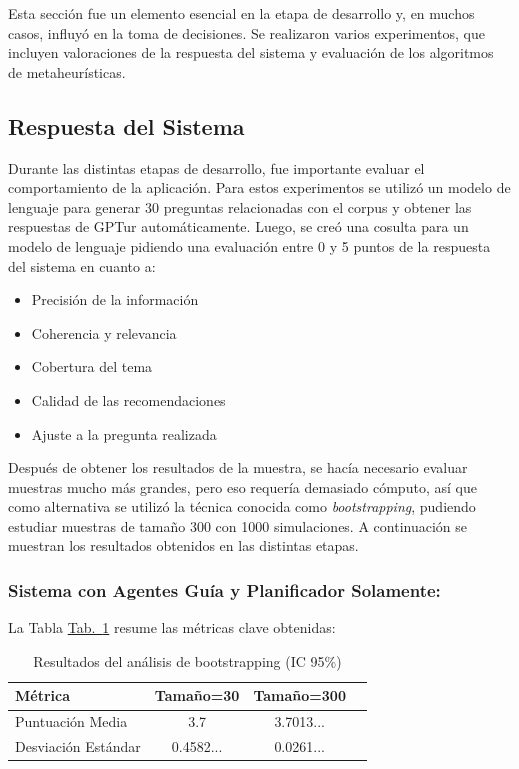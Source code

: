 \documentclass[10pt]{llncs}
\newcommand{\tabref}[1]{\hyperref[#1]{Tab.~\ref*{#1}}}
\begin{document}
Esta sección fue un elemento esencial en la etapa de desarrollo y, en muchos casos, influyó en la toma de decisiones. Se realizaron varios experimentos, que incluyen valoraciones de la respuesta del sistema y evaluación de los algoritmos de metaheurísticas.
\vspace{\baselineskip}
\subsection{Respuesta del Sistema}

Durante las distintas etapas de desarrollo, fue importante evaluar el comportamiento de la aplicación. Para estos experimentos se utilizó un modelo de lenguaje para generar 30 preguntas relacionadas con el corpus y obtener las respuestas de GPTur automáticamente. Luego, 
se creó una cosulta para un modelo de lenguaje pidiendo una evaluación entre 0 y 5 puntos de la respuesta del sistema en cuanto a:
\begin{itemize}
    \item  Precisión de la información
    \item Coherencia y relevancia
    \item Cobertura del tema
    \item Calidad de las recomendaciones
    \item Ajuste a la pregunta realizada
\end{itemize}

Después de obtener los resultados de la muestra, se hacía necesario evaluar muestras mucho más grandes, pero eso requería demasiado cómputo, así que como alternativa se utilizó la técnica conocida como \textit{bootstrapping}, pudiendo estudiar muestras de tamaño 300 con 1000 simulaciones. A continuación se muestran los resultados obtenidos 
en las distintas etapas.

\subsubsection{Sistema con Agentes Guía y Planificador Solamente:}

La Tabla \tabref{tab:boot_results_1} resume las métricas clave obtenidas:

\begin{table}[h]
\centering
\caption{Resultados del análisis de bootstrapping (IC 95\%)}
\label{tab:boot_results_1}
\begin{tabular}{lccc}
\hline
\textbf{Métrica} & \textbf{Tamaño=30} & \textbf{Tamaño=300}  \\
\hline 
Puntuación Media& 3.7 & 3.7013...  \\
Desviación Estándar & 0.4582... & 0.0261...  \\
\hline
\end{tabular}
\end{table}
\end{document}
